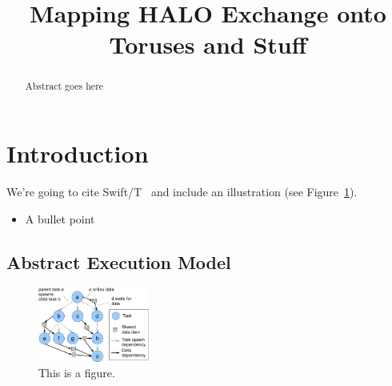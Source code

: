 \documentclass[conference,10pt]{IEEEtran}
\begin{document}
\setlength{\pdfpageheight}{\paperheight}
\setlength{\pdfpagewidth}{\paperwidth}


\title{Mapping HALO Exchange onto Toruses and Stuff}

\author{
}

\maketitle

 
\begin{abstract}
Abstract goes here
\end{abstract}

\section{Introduction}
We're going to cite Swift/T~\cite{SwiftT_2013} and include an illustration
(see Figure~\ref{fig:task-data}). 

\begin{itemize}
  \item A bullet point
\end{itemize}

\subsection{Abstract Execution Model}
\label{sect:ddt-model}
\begin{figure}
  \center
  \includegraphics[width=0.325\textwidth]{fig/task-data}
  \caption{This is a figure.
    \label{fig:task-data}}
\end{figure}



\end{document}

